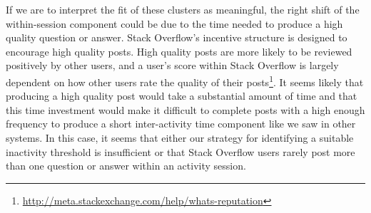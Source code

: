 If we are to interpret the fit of these clusters as meaningful, the right shift of the within-session component could be due to the time needed to produce a high quality question or answer.  Stack Overflow's incentive structure is designed to encourage high quality posts.  High quality posts are more likely to be reviewed positively by other users, and a user's score within Stack Overflow is largely dependent on how other users rate the quality of their posts\footnote{\url{http://meta.stackexchange.com/help/whats-reputation}}.  It seems likely that producing a high quality post would take a substantial amount of time and that this time investment would make it difficult to complete posts with a high enough frequency to produce a short inter-activity time component like we saw in other systems.  In this case, it seems that either our strategy for identifying a suitable inactivity threshold is insufficient or that Stack Overflow users rarely post more than one question or answer within an activity session.

\vskip 20pt
